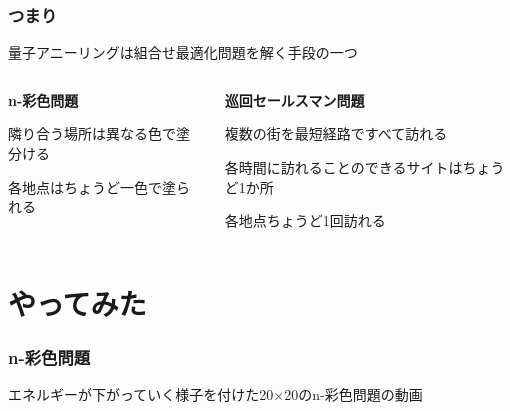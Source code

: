 \begin{frame}
  \frametitle{つまり}

  {\Large   量子アニーリングは組合せ最適化問題を解く手段の一つ}
  \vspace{5mm}

  \begin{columns}
    \begin{column}{0.45\textwidth}
      \textbf{n-彩色問題}
      \begin{itemize}
          \item 隣り合う場所は異なる色で塗分ける
          {\pause \item {\color{important_font}各地点はちょうど一色で塗られる}}
      \end{itemize}
    \end{column}

    \begin{column}{0.45\textwidth}
      \textbf{巡回セールスマン問題}
      \begin{itemize}
          \item 複数の街を最短経路ですべて訪れる
          {\pause \item {\color{important_font}各時間に訪れることのできるサイトはちょうど1か所}}
          {\pause \item {\color{important_font}各地点ちょうど1回訪れる}}
      \end{itemize}
    \end{column}
  \end{columns}
  \vspace{5mm}
\end{frame}

\section{やってみた}
\begin{frame}
  \frametitle{n-彩色問題}
  エネルギーが下がっていく様子を付けた20×20のn-彩色問題の動画
\end{frame}

